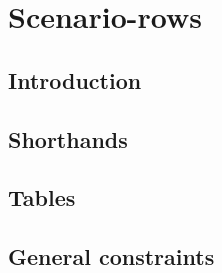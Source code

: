 \section{Scenario-rows } %
\subsection{Introduction}                      \label{hub: scenarios: intro}           
\subsection{Shorthands          }    \label{hub: scenarios: shorthands}       %
\subsection{Tables}                            \label{hub: scenarios: tables}          
\subsection{General constraints }    \label{hub: scenarios: generalities}     %
